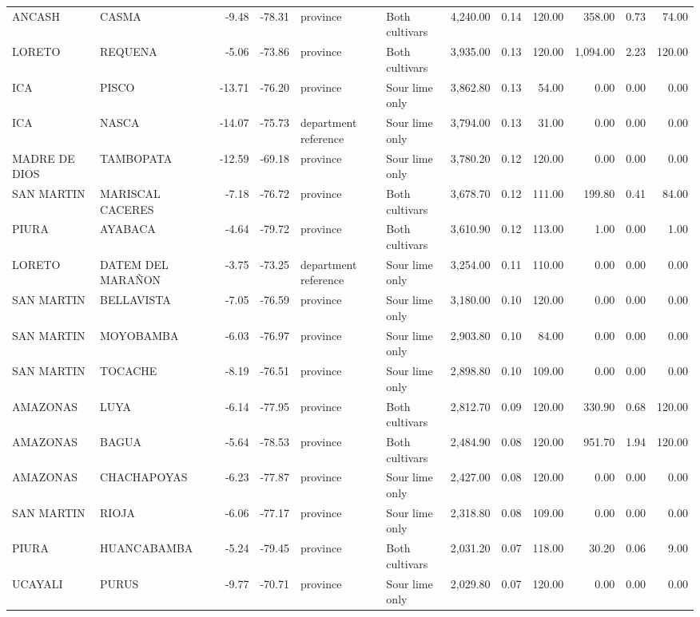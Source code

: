 \begin{longtable}{llrrllrrrrrr}
ANCASH & CASMA & -9.48 & -78.31 & province & Both cultivars & 4,240.00 & 0.14 & 120.00 & 358.00 & 0.73 & 74.00 \\
LORETO & REQUENA & -5.06 & -73.86 & province & Both cultivars & 3,935.00 & 0.13 & 120.00 & 1,094.00 & 2.23 & 120.00 \\
ICA & PISCO & -13.71 & -76.20 & province & Sour lime only & 3,862.80 & 0.13 & 54.00 & 0.00 & 0.00 & 0.00 \\
ICA & NASCA & -14.07 & -75.73 & department reference & Sour lime only & 3,794.00 & 0.13 & 31.00 & 0.00 & 0.00 & 0.00 \\
MADRE DE DIOS & TAMBOPATA & -12.59 & -69.18 & province & Sour lime only & 3,780.20 & 0.12 & 120.00 & 0.00 & 0.00 & 0.00 \\
SAN MARTIN & MARISCAL CACERES & -7.18 & -76.72 & province & Both cultivars & 3,678.70 & 0.12 & 111.00 & 199.80 & 0.41 & 84.00 \\
PIURA & AYABACA & -4.64 & -79.72 & province & Both cultivars & 3,610.90 & 0.12 & 113.00 & 1.00 & 0.00 & 1.00 \\
LORETO & DATEM DEL MARAÑON & -3.75 & -73.25 & department reference & Sour lime only & 3,254.00 & 0.11 & 110.00 & 0.00 & 0.00 & 0.00 \\
SAN MARTIN & BELLAVISTA & -7.05 & -76.59 & province & Sour lime only & 3,180.00 & 0.10 & 120.00 & 0.00 & 0.00 & 0.00 \\
SAN MARTIN & MOYOBAMBA & -6.03 & -76.97 & province & Sour lime only & 2,903.80 & 0.10 & 84.00 & 0.00 & 0.00 & 0.00 \\
SAN MARTIN & TOCACHE & -8.19 & -76.51 & province & Sour lime only & 2,898.80 & 0.10 & 109.00 & 0.00 & 0.00 & 0.00 \\
AMAZONAS & LUYA & -6.14 & -77.95 & province & Both cultivars & 2,812.70 & 0.09 & 120.00 & 330.90 & 0.68 & 120.00 \\
AMAZONAS & BAGUA & -5.64 & -78.53 & province & Both cultivars & 2,484.90 & 0.08 & 120.00 & 951.70 & 1.94 & 120.00 \\
AMAZONAS & CHACHAPOYAS & -6.23 & -77.87 & province & Sour lime only & 2,427.00 & 0.08 & 120.00 & 0.00 & 0.00 & 0.00 \\
SAN MARTIN & RIOJA & -6.06 & -77.17 & province & Sour lime only & 2,318.80 & 0.08 & 109.00 & 0.00 & 0.00 & 0.00 \\
PIURA & HUANCABAMBA & -5.24 & -79.45 & province & Both cultivars & 2,031.20 & 0.07 & 118.00 & 30.20 & 0.06 & 9.00 \\
UCAYALI & PURUS & -9.77 & -70.71 & province & Sour lime only & 2,029.80 & 0.07 & 120.00 & 0.00 & 0.00 & 0.00 \\

\end{longtable}
